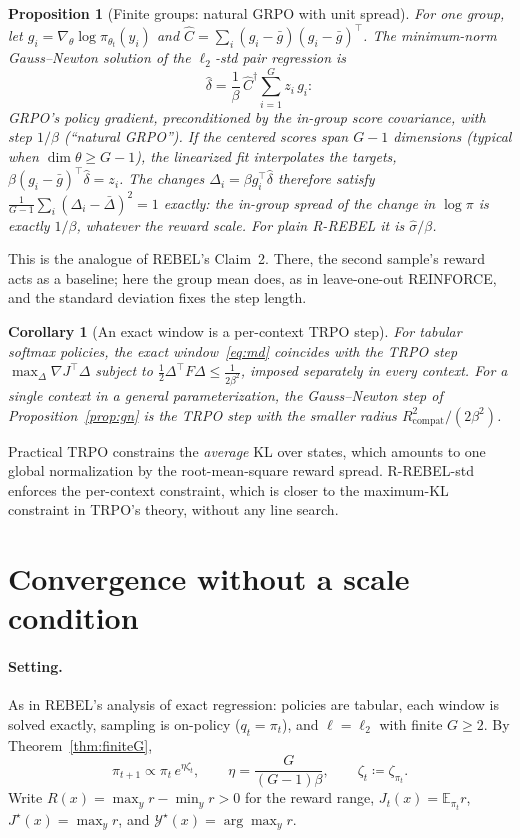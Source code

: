 \documentclass[11pt]{article}
\newtheorem{proposition}[theorem]{Proposition}
\newtheorem{corollary}[theorem]{Corollary}
\theoremstyle{definition}
\theoremstyle{remark}
\newcommand{\E}{\mathbb{E}}
\newcommand{\cY}{\mathcal{Y}}
\newcommand{\1}{\mathbb{1}}
\newcommand{\rr}{R-REBEL}
\newcommand{\rrs}{R-REBEL-std}
\begin{document}
\begin{proposition}[Finite groups: natural GRPO with unit spread]\label{prop:gnfinite}
For one group, let $g_i=\nabla_\theta\log\pi_{\theta_t}(y_i)$ and
$\hat C=\sum_i(g_i-\bar g)(g_i-\bar g)^\top$. The minimum-norm Gauss--Newton solution
of the $\ell_2$-std pair regression is
\[
  \hat\delta=\frac1\beta\,\hat C^{\dagger}\sum_{i=1}^G z_i\,g_i:
\]
GRPO's policy gradient, preconditioned by the in-group score covariance, with step
$1/\beta$ (``natural GRPO''). If the centered scores span $G-1$ dimensions (typical
when $\dim\theta\ge G-1$), the linearized fit interpolates the targets,
$\beta(g_i-\bar g)^\top\hat\delta=z_i$. The changes $\Delta_i=\beta g_i^\top\hat\delta$
therefore satisfy $\frac{1}{G-1}\sum_i(\Delta_i-\bar\Delta)^2=1$ exactly: the in-group
spread of the change in $\log\pi$ is exactly $1/\beta$, whatever the reward scale.
For plain \rr{} it is $\hat\sigma/\beta$.
\end{proposition}

This is the analogue of REBEL's Claim~2. There, the second sample's reward acts as
a baseline; here the group mean does, as in leave-one-out REINFORCE, and the
standard deviation fixes the step length.

\begin{corollary}[An exact window is a per-context TRPO step]\label{cor:trpo}
For tabular softmax policies, the exact window~\eqref{eq:md} coincides with the TRPO
step~\cite{trpo} $\max_\Delta\nabla J^\top\Delta$ subject to
$\frac12\Delta^\top F\Delta\le\frac{1}{2\beta^2}$, imposed \emph{separately in every
context}. For a single context in a general parameterization, the Gauss--Newton step
of Proposition~\ref{prop:gn} is the TRPO step with the smaller radius
$R^2_{\mathrm{compat}}/(2\beta^2)$.
\end{corollary}

Practical TRPO constrains the \emph{average} KL over states, which amounts to one
global normalization by the root-mean-square reward spread. \rrs{} enforces the
per-context constraint, which is closer to the maximum-KL constraint in TRPO's
theory, without any line search.

\section{Convergence without a scale condition}\label{sec:rate}

\paragraph{Setting.} As in REBEL's analysis of exact regression: policies are
tabular, each window is solved exactly, sampling is on-policy ($q_t=\pi_t$), and
$\ell=\ell_2$ with finite $G\ge2$. By Theorem~\ref{thm:finiteG},
\begin{equation}\label{eq:exactstd}
  \pi_{t+1}\propto\pi_t\,e^{\eta\zeta_t},\qquad\eta=\frac{G}{(G-1)\beta},\qquad\zeta_t\coloneqq\zeta_{\pi_t}.
\end{equation}
Write $R(x)=\max_yr-\min_yr>0$ for the reward range, $J_t(x)=\E_{\pi_t}r$,
$J^\star(x)=\max_yr$, and $\cY^\star(x)=\arg\max_yr$.
\end{document}
